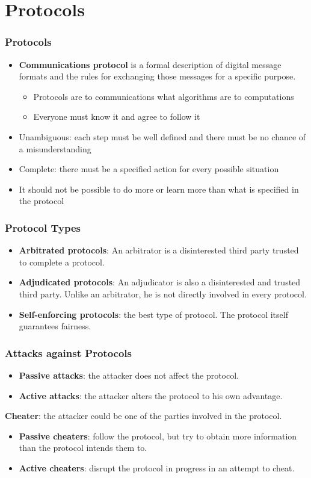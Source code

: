 \section{Protocols}
\begin{frame}\frametitle{Protocols}
\begin{itemize}
\item \textbf{Communications protocol} is a formal description of digital message formats and the rules for exchanging those messages for a specific purpose.
\begin{itemize}
\item Protocols are to communications what algorithms are to computations
\item Everyone must know it and agree to follow it
\end{itemize}
\item Unambiguous: each step must be well defined and there must be no chance of a misunderstanding
\item Complete: there must be a specified action for every possible situation
\item It should not be possible to do more or learn more than what is specified in the protocol
\end{itemize}
\end{frame}
\begin{frame}\frametitle{Protocol Types}
\begin{itemize}
\item \textbf{Arbitrated protocols}: An arbitrator is a disinterested third party trusted to complete a protocol.
\item \textbf{Adjudicated protocols}: An adjudicator is also a disinterested and trusted third party. Unlike an arbitrator, he is not directly involved in every protocol.
\item \textbf{Self-enforcing protocols}: the best type of protocol. The protocol itself guarantees fairness.
\end{itemize}
\end{frame}
\begin{frame}\frametitle{Attacks against Protocols}
\begin{itemize}
\item \textbf{Passive attacks}: the attacker does not affect the protocol.
\item \textbf{Active attacks}: the attacker alters the protocol to his own advantage.
\end{itemize}
\textbf{Cheater}: the attacker could be one of the parties involved in the protocol.
\begin{itemize}
\item \textbf{Passive cheaters}: follow the protocol, but try to obtain more information than the protocol intends them to.
\item \textbf{Active cheaters}: disrupt the protocol in progress in an attempt to cheat.
\end{itemize}
\end{frame}
